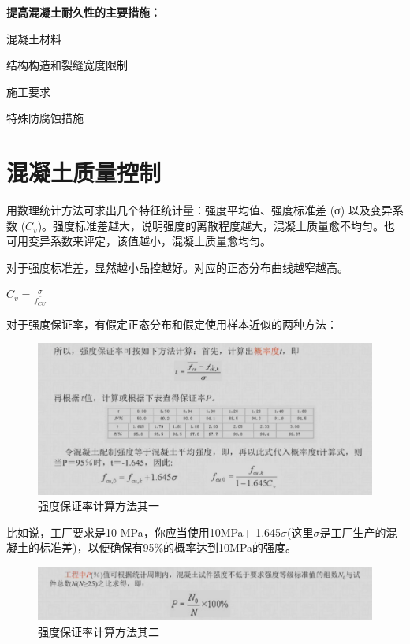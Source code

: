 \documentclass[12pt, a4paper, oneside, UTF8]{ctexbook}
\begin{document}
\textbf{提高混凝土耐久性的主要措施：}

混凝土材料

结构构造和裂缝宽度限制

施工要求

特殊防腐蚀措施

\section{混凝土质量控制}
用数理统计方法可求出几个特征统计量：强度平均值、强度标准差 (σ) 以及变异系数 ($C_v$)。强度标准差越大，说明强度的离散程度越大，混凝土质量愈不均匀。也可用变异系数来评定，该值越小，混凝土质量愈均匀。

\begin{remark}
    对于强度标准差，显然越小品控越好。对应的正态分布曲线越窄越高。

    $C_v = \frac{\sigma}{\bar{f_{CU}}}$
\end{remark}

对于强度保证率，有假定正态分布和假定使用样本近似的两种方法：

\begin{figure}[H]
	\centering
	\includegraphics[width=0.9\linewidth]{../figure/tzhibiao.png} %
	\caption{强度保证率计算方法其一}
	\label{fig:tzhibiao}
\end{figure}

比如说，工厂要求是10 MPa，你应当使用10MPa+ 1.645$\sigma$(这里$\sigma$是工厂生产的混凝土的标准差)，以便确保有95\%的概率达到10MPa的强度。

\begin{figure}[H]
	\centering
	\includegraphics[width=0.9\linewidth]{../figure/SAA.png} %
	\caption{强度保证率计算方法其二}
	\label{fig:SAA}
\end{figure}
\end{document}
